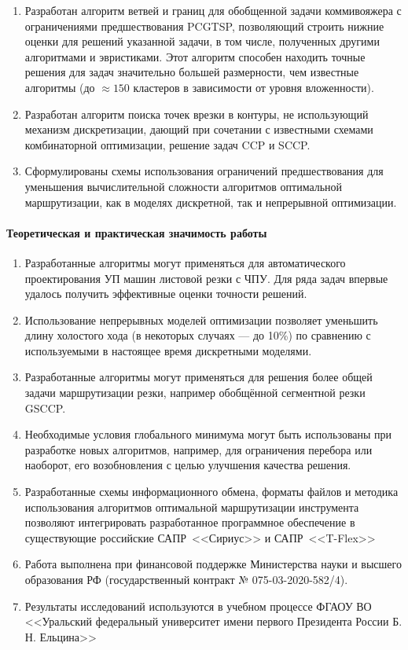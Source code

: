 \begin{enumerate}
    \item
    Разработан алгоритм ветвей и границ для обобщенной задачи коммивояжера с ограничениями предшествования PCGTSP,
    позволяющий строить нижние оценки для решений указанной задачи,
    в том числе, полученных другими алгоритмами и эвристиками.
    Этот алгоритм способен находить точные решения
    для задач значительно большей размерности,
    чем известные алгоритмы
    (до $\approx 150$ кластеров в зависимости от уровня вложенности).
    \item
    Разработан алгоритм поиска точек врезки в контуры,
    не использующий механизм дискретизации,
    дающий при сочетании с известными схемами комбинаторной оптимизации,
    решение задач
    CCP и SCCP.
    \item
    Сформулированы схемы использования ограничений предшествования
    для уменьшения вычислительной сложности алгоритмов оптимальной маршрутизации,
    как в моделях дискретной,
    так и непрерывной оптимизации.
\end{enumerate}

\paragraph*{Теоретическая и практическая значимость работы}

\begin{enumerate}
    \item
    Разработанные алгоритмы могут применяться для
    автоматического проектирования УП машин листовой резки с ЧПУ.
    Для ряда задач впервые удалось получить эффективные оценки точности решений.
    \item
    Использование непрерывных моделей оптимизации
    позволяет уменьшить длину
    холостого хода
    (в некоторых случаях --- до 10\%)
    по сравнению с используемыми
    в настоящее время дискретными моделями.
    \item
    Разработанные алгоритмы могут применяться для решения
    более общей задачи
    маршрутизации резки,
    например обобщённой сегментной резки GSCCP.
    \item
    Необходимые условия глобального минимума могут быть использованы при разработке новых
    алгоритмов, например, для ограничения перебора или наоборот,
    его возобновления с целью улучшения качества решения.
    \item
    Разработанные схемы информационного обмена,
    форматы файлов и методика использования алгоритмов
    оптимальной маршрутизации инструмента
    позволяют интегрировать разработанное программное обеспечение
    в существующие российские САПР~<<Сириус>>
    и САПР~<<T-Flex>>
    \item
    Работа выполнена при финансовой поддержке
    Министерства науки и высшего образования РФ
    (государственный контракт № 075-03-2020-582/4).
    \item
    Результаты исследований используются в учебном процессе
    ФГАОУ ВО <<Уральский федеральный университет имени первого Президента России Б. Н. Ельцина>>
\end{enumerate}

